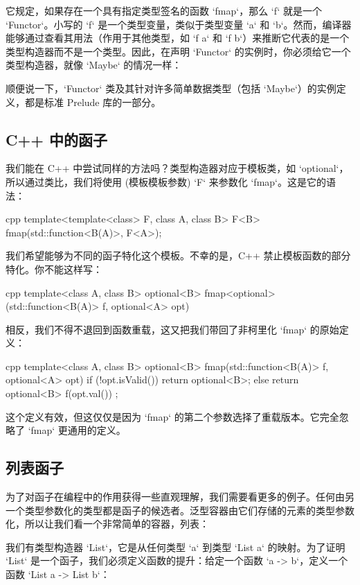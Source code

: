 它规定，如果存在一个具有指定类型签名的函数 `fmap`，那么 `f` 就是一个 `Functor`。小写的 `f` 是一个类型变量，类似于类型变量 `a` 和 `b`。然而，编译器能够通过查看其用法（作用于其他类型，如 `f a` 和 `f b`）来推断它代表的是一个类型构造器而不是一个类型。因此，在声明 `Functor` 的实例时，你必须给它一个类型构造器，就像 `Maybe` 的情况一样：

顺便说一下，`Functor` 类及其针对许多简单数据类型（包括 `Maybe`）的实例定义，都是标准 Prelude 库的一部分。

\subsection{C++ 中的函子}

我们能在 C++ 中尝试同样的方法吗？类型构造器对应于模板类，如 `optional`，所以通过类比，我们将使用  (模板模板参数) `F` 来参数化 `fmap`。这是它的语法：

\begin{snip}{cpp}
template<template<class> F, class A, class B>
F<B> fmap(std::function<B(A)>, F<A>);
\end{snip}
我们希望能够为不同的函子特化这个模板。不幸的是，C++ 禁止模板函数的部分特化。你不能这样写：

\begin{snip}{cpp}
template<class A, class B>
optional<B> fmap<optional>(std::function<B(A)> f, optional<A> opt)
\end{snip}
相反，我们不得不退回到函数重载，这又把我们带回了非柯里化 `fmap` 的原始定义：

\begin{snip}{cpp}
template<class A, class B>
optional<B> fmap(std::function<B(A)> f, optional<A> opt) {
    if (!opt.isValid())
        return optional<B>{};
    else
        return optional<B>{ f(opt.val()) };
}
\end{snip}
这个定义有效，但这仅仅是因为 `fmap` 的第二个参数选择了重载版本。它完全忽略了 `fmap` 更通用的定义。

\subsection{列表函子}

为了对函子在编程中的作用获得一些直观理解，我们需要看更多的例子。任何由另一个类型参数化的类型都是函子的候选者。泛型容器由它们存储的元素的类型参数化，所以让我们看一个非常简单的容器，列表：

我们有类型构造器 `List`，它是从任何类型 `a` 到类型 `List a` 的映射。为了证明 `List` 是一个函子，我们必须定义函数的提升：给定一个函数 `a -> b`，定义一个函数 `List a -> List b`：


